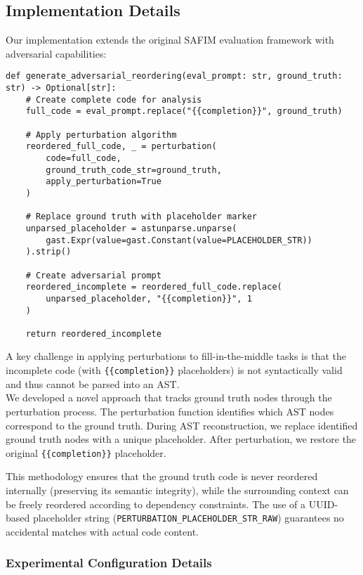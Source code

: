 \documentclass[%
thesis=student,%
coverpage=false,%
titlepage=false,%
headmarks=true, %
english,%
font=libertine, %
math=newpxtx, %
BCOR=5mm,%
coverBCOR=11mm%
]{tum-templates/book/tumbook}
\begin{document}
\subsection{Implementation Details}

Our implementation extends the original SAFIM evaluation framework with adversarial capabilities:
\begin{lstlisting}[style=pythonstyle, caption={Adversarial Example Generation for SAFIM}]
def generate_adversarial_reordering(eval_prompt: str, ground_truth: str) -> Optional[str]:
    # Create complete code for analysis
    full_code = eval_prompt.replace("{{completion}}", ground_truth)
    
    # Apply perturbation algorithm
    reordered_full_code, _ = perturbation(
        code=full_code,
        ground_truth_code_str=ground_truth,
        apply_perturbation=True
    )
    
    # Replace ground truth with placeholder marker
    unparsed_placeholder = astunparse.unparse(
        gast.Expr(value=gast.Constant(value=PLACEHOLDER_STR))
    ).strip()
    
    # Create adversarial prompt
    reordered_incomplete = reordered_full_code.replace(
        unparsed_placeholder, "{{completion}}", 1
    )
    
    return reordered_incomplete
\end{lstlisting}
A key challenge in applying perturbations to fill-in-the-middle tasks is that the incomplete code (with \texttt{\{\{completion\}\}} placeholders) is not syntactically valid and thus cannot be parsed into an AST. \\
We developed a novel approach that tracks ground truth nodes through the perturbation process. 
The perturbation function identifies which AST nodes correspond to the ground truth. 
During AST reconstruction, we replace identified ground truth nodes with a unique placeholder.
After perturbation, we restore the original \texttt{\{\{completion\}\}} placeholder.

This methodology ensures that the ground truth code is never reordered internally (preserving its semantic integrity), while the surrounding context can be freely reordered according to dependency constraints. The use of a UUID-based placeholder string (\texttt{PERTURBATION\_PLACEHOLDER\_STR\_RAW}) guarantees no accidental matches with actual code content.


\subsubsection{Experimental Configuration Details}
\end{document}

